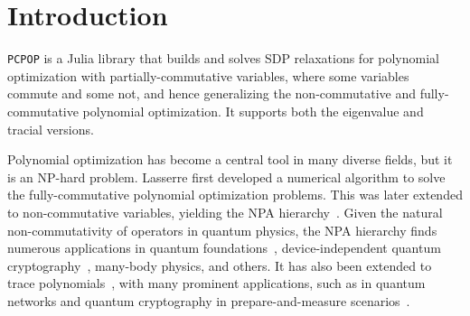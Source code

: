 \section{Introduction}
\texttt{PCPOP} is a Julia library that builds and solves SDP relaxations for polynomial optimization with partially-commutative variables, where some variables commute and some not, and hence generalizing the non-commutative and fully-commutative polynomial optimization. It supports both the eigenvalue and tracial versions.


Polynomial optimization has become a central tool in many diverse fields, but it is an NP-hard problem. Lasserre first developed a numerical algorithm to solve the fully-commutative polynomial optimization problems\cite{doi:10.1137/S1052623400366802}. This was later extended to non-commutative variables, yielding the NPA hierarchy~\cite{doi:10.1137/090760155,Navascués_2008}. Given the natural non-commutativity of operators in quantum physics, the NPA hierarchy finds numerous applications in quantum foundations~\cite{RevModPhys.96.045006}, device-independent quantum cryptography~\cite{Primaatmaja2023securityofdevice}, many-body physics\cite{PhysRevX.14.031006}, and others. It has also been extended to trace polynomials~\cite{Burgdorf2013}, with many prominent applications, such as in quantum networks and quantum cryptography in prepare-and-measure scenarios~\cite{Tavakoli2022informationally,Tavakoli_2022}. 

